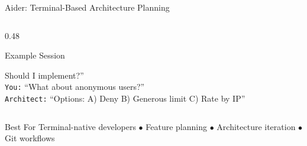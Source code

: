 \documentclass[aspectratio=169,10pt]{beamer}
\begin{document}
\begin{frame}{Aider: Terminal-Based Architecture Planning}
\begin{columns}[T]
\begin{column}{0.48\textwidth}
\begin{block}{Example Session}
\begin{itemize}
                \end{itemize}
                Should I implement?''\\[0.2cm]
                \texttt{You:} ``What about anonymous users?''\\[0.2cm]
                \texttt{Architect:} ``Options: A) Deny B) Generous limit C) Rate by IP''
            \end{block}
        \end{column}
    \end{columns}
    \vspace{0.2cm}
    \begin{block}{Best For}
        Terminal-native developers $\bullet$ Feature planning $\bullet$ Architecture iteration $\bullet$ Git workflows
    \end{block}

\end{frame}
\end{document}

